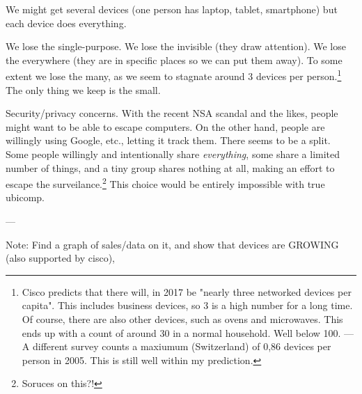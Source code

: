 We might get several devices (one person has laptop, tablet, smartphone) but each device does everything.

We lose the single-purpose. We lose the invisible (they draw attention). We lose the everywhere (they are in specific places
so we can put them away). To some extent we lose the many, as we seem to stagnate around 3 devices per person.\footnote{Cisco
predicts that there will, in 2017 be "nearly three networked devices per capita". This includes business devices, so 3 is a
high number for a long time.\cite{cisco} Of course, there are also other devices, such as ovens and microwaves. This ends up
with a count of around 30 in a normal household. Well below 100. --- A different survey counts a maxiumum (Switzerland) of
0,86 devices per person in 2005. This is still well within my prediction.\cite{nationmaster}} The only thing we keep is the small.

Security/privacy concerns. With the recent NSA scandal and the likes, people might want to be able to escape computers.
On the other hand, people are willingly using Google, etc., letting it track them. There seems to be a split. Some people
willingly and intentionally share \emph{everything}, some share a limited number of things, and a tiny group shares nothing
at all, making an effort to escape the surveilance.\footnote{Soruces on this?!} This choice would be entirely impossible
with true ubicomp.

---

Note: Find a graph of sales/data on it, and show that devices are GROWING (also supported by cisco),